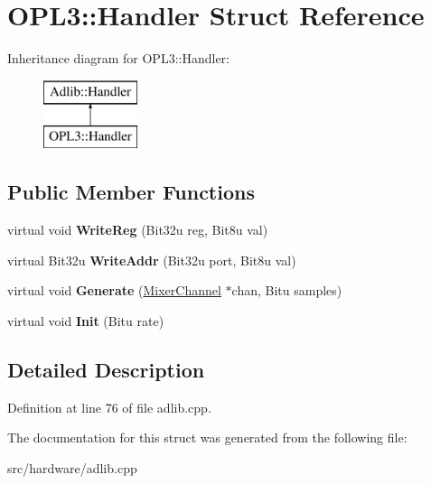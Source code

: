 \hypertarget{structOPL3_1_1Handler}{\section{O\-P\-L3\-:\-:Handler Struct Reference}
\label{structOPL3_1_1Handler}
}
Inheritance diagram for O\-P\-L3\-:\-:Handler\-:\begin{figure}[H]
\begin{center}
\leavevmode
\includegraphics[height=2.000000cm]{structOPL3_1_1Handler}
\end{center}
\end{figure}
\subsection*{Public Member Functions}
\begin{DoxyCompactItemize}
\item 
\hypertarget{structOPL3_1_1Handler_abd58ad3a3a13fcc8ef3e19bf1fd76bd1}{virtual void {\bfseries Write\-Reg} (Bit32u reg, Bit8u val)}\label{structOPL3_1_1Handler_abd58ad3a3a13fcc8ef3e19bf1fd76bd1}

\item 
\hypertarget{structOPL3_1_1Handler_aeb1af51c1839cc20712d4434077a7dcb}{virtual Bit32u {\bfseries Write\-Addr} (Bit32u port, Bit8u val)}\label{structOPL3_1_1Handler_aeb1af51c1839cc20712d4434077a7dcb}

\item 
\hypertarget{structOPL3_1_1Handler_ae5db8d97daf264ca7c1d4efd9a967323}{virtual void {\bfseries Generate} (\hyperlink{classMixerChannel}{Mixer\-Channel} $\ast$chan, Bitu samples)}\label{structOPL3_1_1Handler_ae5db8d97daf264ca7c1d4efd9a967323}

\item 
\hypertarget{structOPL3_1_1Handler_ac1b6b29e04d2c9bd45abad402a44e380}{virtual void {\bfseries Init} (Bitu rate)}\label{structOPL3_1_1Handler_ac1b6b29e04d2c9bd45abad402a44e380}

\end{DoxyCompactItemize}


\subsection{Detailed Description}


Definition at line 76 of file adlib.\-cpp.



The documentation for this struct was generated from the following file\-:\begin{DoxyCompactItemize}
\item 
src/hardware/adlib.\-cpp\end{DoxyCompactItemize}
